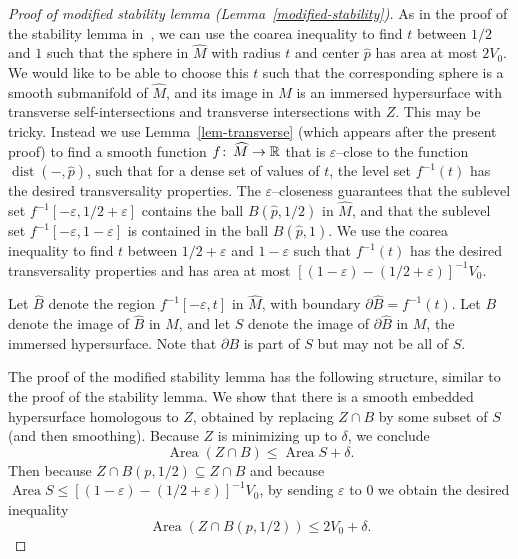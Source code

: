 \documentclass[12pt]{amsart}
\numberwithin{equation}{section}
\begin{document}
\begin{proof}[Proof of modified stability lemma (Lemma~\ref{modified-stability})]
 As in the proof of the stability lemma in~\cite{Guth10}, we can use the
 coarea inequality to find $t$ between $1/2$ and $1$ such that the
 sphere in $\widehat{M}$ with radius $t$ and center $\widehat{p}$ has
 area at most $2V_0$.  We would like to be able to choose this $t$ such
 that the corresponding sphere is a smooth submanifold of $\widehat{M}$,
 and its image in $M$ is an immersed hypersurface with transverse
 self-intersections and transverse intersections with $Z$. This may be tricky. Instead we use Lemma~\ref{lem-transverse} (which appears after the present proof) to find a smooth function $f {\colon\thinspace} \widehat{M} \rightarrow \mathbb{R}$ that is $\varepsilon$--close to the function $\operatorname{dist}(-, \widehat{p})$, such that for a dense set of values of $t$, the level set $f^{-1}(t)$ has the desired transversality properties.  The $\varepsilon$--closeness guarantees that the sublevel set $f^{-1}[-\varepsilon, 1/2 + \varepsilon]$ contains the ball $B(\widehat{p}, 1/2)$ in $\widehat{M}$, and that the sublevel set $f^{-1}[-\varepsilon, 1 - \varepsilon]$ is contained in the ball $B(\widehat{p}, 1)$.  We use the coarea inequality to find $t$ between $1/2 + \varepsilon$ and $1-\varepsilon$ such that $f^{-1}(t)$ has the desired transversality properties and has area at most $[(1-\varepsilon) - (1/2 + \varepsilon)]^{-1}V_0$.

Let $\widehat{B}$ denote the region $f^{-1}[-\varepsilon, t]$ in $\widehat{M}$, with boundary ${\partial} \widehat{B} = f^{-1}(t)$.  Let $B$ denote the image of $\widehat{B}$ in $M$, and let $S$ denote the image of ${\partial} \widehat{B}$ in $M$, the immersed hypersurface.  Note that ${\partial} B$ is part of $S$ but may not be all of $S$.

The proof of the modified stability lemma has the following structure, similar to the proof of the stability lemma.  We show that there is a smooth embedded hypersurface homologous to $Z$, obtained by replacing $Z \cap B$ by some subset of $S$ (and then smoothing).  Because $Z$ is minimizing up to $\delta$, we conclude
\[\operatorname{Area} (Z \cap B) \leq \operatorname{Area} S + \delta.\]
Then because $Z \cap B(p, 1/2) \subseteq Z \cap B$ and because $\operatorname{Area} S \leq [(1-\varepsilon) - (1/2 + \varepsilon)]^{-1}V_0$, by sending $\varepsilon$ to $0$ we obtain the desired inequality
\[\operatorname{Area} (Z \cap B(p, 1/2)) \leq 2V_0 + \delta.\]


\end{proof}
\end{document}
